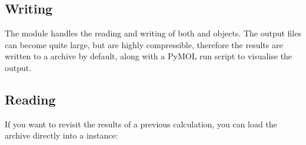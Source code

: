\documentclass[letterpaper,10pt,english]{sphinxmanual}
\begin{document}
\subsection{Writing}
\label{\detokenize{tutorial:writing}}
The {\hyperref[\detokenize{hs_io_api:module-hotspots.hs_io}]{}} module handles the reading and writing of both 
and  objects. The output  files can become quite large, but are highly
compressible, therefore the results are written to a  archive by default, along with a PyMOL run script to
visualise the output.

\begin{sphinxVerbatim}[commandchars=\\\{\}]
   

  

     
\end{sphinxVerbatim}


\subsection{Reading}
\label{\detokenize{tutorial:reading}}
If you want to revisit the results of a previous calculation, you can load the  archive directly into a
 instance:

\begin{sphinxVerbatim}[commandchars=\\\{\}]
   

  
\end{sphinxVerbatim}
\end{document}
